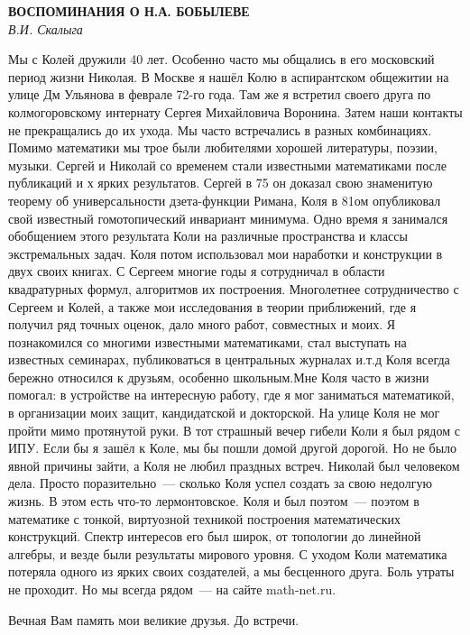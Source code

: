 \begin{center}{ \bf  ВОСПОМИНАНИЯ О Н.А. БОБЫЛЕВЕ}\\
{\it В.И. Скалыга} \\
\end{center}
Мы с Колей дружили 40 лет. Особенно часто мы общались в его московский период жизни Николая.
В Москве я нашёл Колю в аспирантском общежитии на улице Дм Ульянова в феврале 72-го  года.
Там же   я встретил   своего друга по колмогоровскому интернату Сергея  Михайловича Воронина.
Затем наши контакты не прекращались до их ухода. Мы часто встречались в разных комбинациях. Помимо математики мы трое были любителями хорошей литературы, поэзии, музыки. Сергей и Николай со временем стали  известными математиками после публикаций и  х ярких результатов. Сергей в 75 он  доказал свою знаменитую теорему об универсальности дзета-функции Римана, Коля  в  81ом опубликовал свой известный гомотопический инвариант минимума. Одно время я занимался обобщением этого результата Коли на различные   пространства  и классы экстремальных задач. Коля потом использовал мои наработки и конструкции в двух своих книгах. С Сергеем многие годы я сотрудничал в области квадратурных формул, алгоритмов их построения. Многолетнее сотрудничество с Сергеем и Колей, а также мои исследования в теории приближений, где я получил ряд точных оценок, дало много работ, совместных и моих. Я познакомился со многими известными математиками, стал выступать на известных семинарах, публиковаться в центральных журналах и.т.д Коля всегда бережно относился к друзьям, особенно школьным.Мне Коля часто в жизни помогал: в  устройстве на интересную работу, где я мог заниматься математикой, в организации  моих защит, кандидатской и докторской. На улице Коля не мог пройти мимо протянутой руки.
В тот страшный вечер гибели  Коли я был рядом с ИПУ.  Если бы я зашёл к Коле, мы бы пошли домой другой дорогой.
Но не было явной причины зайти, а Коля не любил праздных встреч. Николай был человеком дела.
Просто поразительно~--- сколько Коля успел создать за свою недолгую жизнь. В  этом есть что-то лермонтовское.
Коля и был поэтом~--- поэтом в математике с  тонкой, виртуозной техникой построения математических конструкций.
Спектр интересов его был широк, от топологии до линейной алгебры, и везде были результаты  мирового уровня.
С уходом Коли математика потеряла одного из ярких своих создателей, а мы бесценного друга.
Боль утраты не проходит. Но мы  всегда рядом~--- на сайте  math-net.ru.

Вечная Вам память мои великие друзья.   До встречи.


